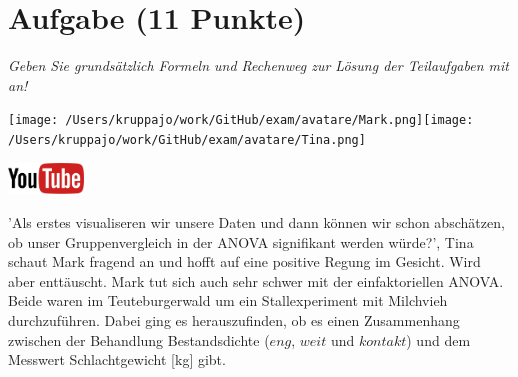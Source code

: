 \documentclass[a4paper, 9pt]{scrartcl}\usepackage[]{graphicx}\usepackage[]{xcolor}
\begin{document}
\section{Aufgabe \hfill (11 Punkte)}

\textit{Geben Sie grundsätzlich Formeln und Rechenweg zur Lösung der Teilaufgaben mit an!} \\[1Ex]
 

 
\begin{minipage}[t]{0.5\textwidth}
\texttt{[image: /Users/kruppajo/work/GitHub/exam/avatare/Mark.png]}\hspace{-4mm}\texttt{[image: /Users/kruppajo/work/GitHub/exam/avatare/Tina.png]}
\end{minipage}
\begin{minipage}[t]{0.5\textwidth}
\hfill
\href{https://youtu.be/kHmfEmU6lrk}{\includegraphics[width = 2cm]{img/youtube}}
\end{minipage}
\vspace{1ex}



'Als erstes visualiseren wir unsere Daten und dann können wir schon abschätzen, ob unser Gruppenvergleich in der ANOVA signifikant werden würde?', Tina schaut Mark fragend an und hofft auf eine positive Regung im Gesicht. Wird aber enttäuscht. Mark tut sich auch sehr schwer mit der einfaktoriellen ANOVA. Beide waren im Teuteburgerwald um ein Stallexperiment mit Milchvieh durchzuführen. Dabei ging es herauszufinden, ob es einen Zusammenhang zwischen der Behandlung Bestandsdichte ($eng$, $weit$ und $kontakt$) und dem Messwert Schlachtgewicht [kg] gibt.
\end{document}
